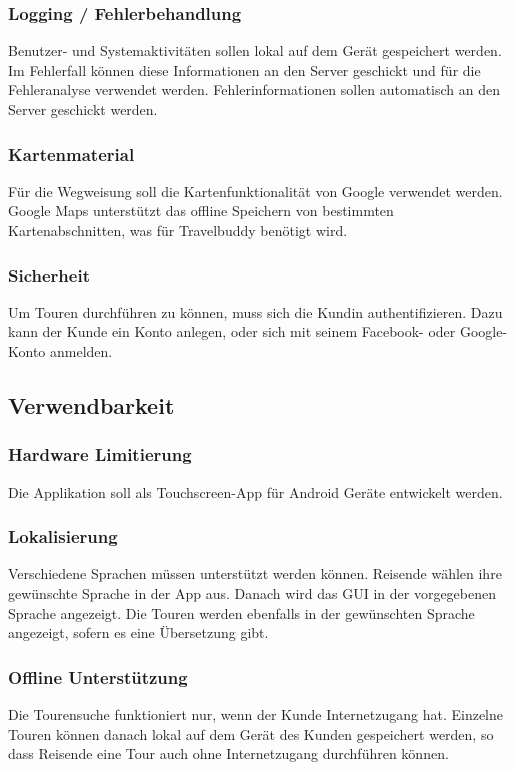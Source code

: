 \documentclass[a4paper,10pt,xetex]{article}
\begin{document}
\subsubsection{Logging / Fehlerbehandlung}\label{logging-fehlerbehandlung}
Benutzer- und Systemaktivitäten sollen lokal auf dem Gerät gespeichert
werden. Im Fehlerfall können diese Informationen an den Server geschickt
und für die Fehleranalyse verwendet werden. Fehlerinformationen sollen
automatisch an den Server geschickt werden.


\subsubsection{Kartenmaterial}\label{kartenmaterial}
Für die Wegweisung soll die Kartenfunktionalität von Google verwendet
werden. Google Maps unterstützt das offline Speichern von bestimmten
Kartenabschnitten, was für Travelbuddy benötigt wird.


\subsubsection{Sicherheit}\label{sicherheit}
Um Touren durchführen zu können, muss sich die Kundin authentifizieren.
Dazu kann der Kunde ein Konto anlegen, oder sich mit seinem Facebook-
oder Google-Konto anmelden.


\subsection{Verwendbarkeit}\label{verwendbarkeit}
\subsubsection{Hardware Limitierung}\label{hardware-limitierung}
Die Applikation soll als Touchscreen-App für Android Geräte entwickelt
werden.


\subsubsection{Lokalisierung}\label{lokalisierung}
Verschiedene Sprachen müssen unterstützt werden können. Reisende wählen
ihre gewünschte Sprache in der App aus. Danach wird das GUI in der
vorgegebenen Sprache angezeigt. Die Touren werden ebenfalls in der
gewünschten Sprache angezeigt, sofern es eine Übersetzung gibt.


\subsubsection{Offline Unterstützung}\label{offline-unterstuxfctzung}
Die Tourensuche funktioniert nur, wenn der Kunde Internetzugang hat.
Einzelne Touren können danach lokal auf dem Gerät des Kunden gespeichert
werden, so dass Reisende eine Tour auch ohne Internetzugang durchführen
können.
\end{document}
